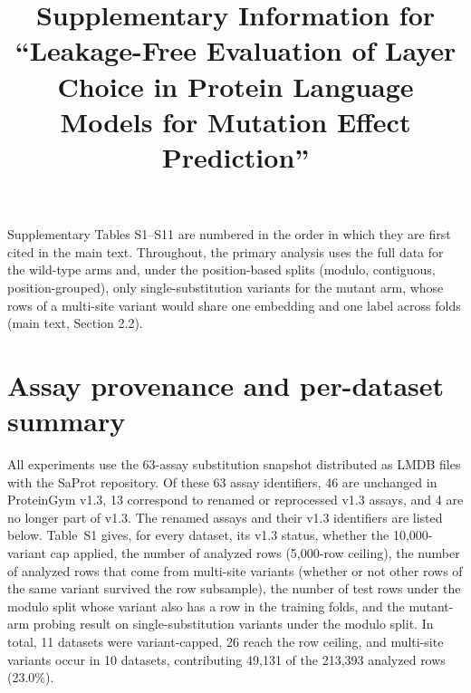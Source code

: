 \documentclass[11pt,a4paper]{article}
\title{Supplementary Information for\\ ``Leakage-Free Evaluation of Layer Choice in Protein Language
Models for Mutation Effect Prediction''}
\date{}
\begin{document}
\maketitle
\noindent Supplementary Tables S1--S11 are numbered in the order in which they are first cited
in the main text. Throughout, the primary analysis uses the full data for the wild-type
arms and, under the position-based splits (modulo, contiguous, position-grouped), only
single-substitution variants for the mutant arm, whose rows of a multi-site variant would
share one embedding and one label across folds (main text, Section 2.2).

\section*{Assay provenance and per-dataset summary}
All experiments use the 63-assay substitution snapshot distributed as LMDB files with the
SaProt repository. Of these 63 assay identifiers, 46 are unchanged in ProteinGym v1.3, 13
correspond to renamed or reprocessed v1.3 assays, and 4 are no longer part of v1.3. The
renamed assays and their v1.3 identifiers are listed below. Table~S1 gives, for every
dataset, its v1.3 status, whether the 10,000-variant cap applied, the number of analyzed
rows (5,000-row ceiling), the number of analyzed rows that come from multi-site variants
(whether or not other rows of the same variant survived the row subsample), the number of
test rows under the modulo split whose variant also has a row in the training folds, and
the mutant-arm probing result on single-substitution variants under the modulo split. In
total, 11 datasets were variant-capped, 26 reach the row ceiling, and multi-site variants
occur in 10 datasets, contributing 49,131 of the 213,393 analyzed rows (23.0\%).
\end{document}
